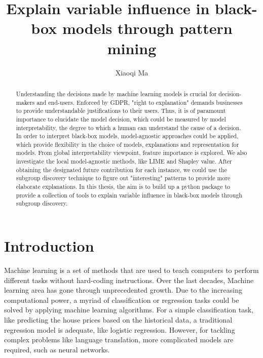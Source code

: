\documentclass[runningheads]{llncs}
\begin{document}
	
	\title{Explain variable influence in black-box models through pattern mining}
	\author{Xiaoqi Ma}
	\maketitle  
	
	\begin{abstract}
		
		Understanding the decisions made by machine learning models is crucial for decision-makers and end-users. Enforced by GDPR, "right to explanation" demands businesses to provide understandable justifications to their users. Thus, it is of paramount importance to elucidate the model decision, which could be measured by model interpretability, the degree to which a human can understand the cause of a decision. In order to interpret black-box models, model-agnostic approaches could be applied, which provide flexibility in the choice of models, explanations and representation for models. From global interpretability viewpoint, feature importance is explored. We also investigate the local model-agnostic methods, like LIME and Shapley value. After obtaining the designated future contribution for each instance, we could use the subgroup discovery technique to figure out "interesting" patterns to provide more elaborate explanations. In this thesis, the aim is to build up a python package to provide a collection of tools to explain variable influence in black-box models through subgroup discovery. 
		
	\end{abstract}
	
	\section{Introduction}
	
	Machine learning is a set of methods that are used to teach computers to perform different tasks without hard-coding instructions. Over the last decades, Machine learning area has gone through unprecedented growth. Due to the increasing computational power, a myriad of classification or regression tasks could be solved by applying machine learning algorithms. For a simple classification task, like predicting the house prices based on the historical data, a traditional regression model is adequate, like logistic regression. However, for tackling complex problems like language translation, more complicated models are required, such as neural networks. 
	
\end{document}
